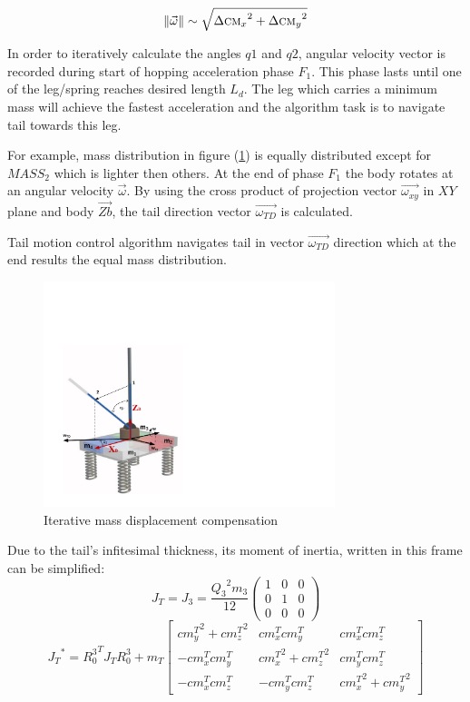\begin{equation}
\left \| \vec{\omega} \right \|\sim \sqrt{{\Delta \textsc{cm}_x}^2+{\Delta \textsc{cm}_y}^2}
\end{equation}


In order to iteratively calculate the angles $q1$ and $q2$, angular velocity vector is recorded during start of hopping acceleration phase $F_1$. This phase lasts until one of the leg/spring reaches desired length $L_d$. The leg which carries a minimum mass will achieve the fastest acceleration and the algorithm task is to navigate tail towards this leg. 

For example, mass distribution in figure  (\ref{fig:imassCom}) is equally distributed except for $MASS_2$  which is lighter then others. At the end of phase $F_1$ the body rotates at an angular velocity $\vec{\omega}$. By using the cross product of projection vector $\vec{\omega_{xy}}$ in $XY$ plane and body $\vec{Zb}$, the tail direction vector $\vec{\omega_{TD}}$ is calculated. 

Tail motion control algorithm navigates tail in vector $\vec{\omega_{TD}}$ direction which at the end results the equal mass distribution.


\begin{figure}
	\centering
	\includegraphics[width=85mm]{./pictures/IterativeAlgorithm.pdf}
	\caption{Iterative mass displacement compensation}
	\label{fig:imassCom}
\end{figure}





Due to the tail's infitesimal thickness, its moment of inertia, written in this frame can be simplified:
\begin{equation}
J_T=J_3=\frac{{Q_3}^2 m_3}{12}\left(
\begin{array}{ccc}
 1 & 0 & 0 \\
 0 & 1 & 0 \\
 0 & 0 & 0
\end{array}
\right)
\end{equation} 
\small
\begin{equation}
{J_T}^*={R_0^3}^TJ_TR_0^3+m_T\begin{bmatrix}
{cm_y^T}^2 +{cm_z^T}^2& {cm_x^T}{cm_y^T}& {cm_x^T}{cm_z^T} \\ 
-{cm_x^T}{cm_y^T} & {cm_x^T}^2+{cm_z^T}^2 & {cm_y^T}{cm_z^T}\\ 
-{cm_x^T}{cm_z^T} & -{cm_y^T}{cm_z^T} & {cm_x^T}^2+{cm_y^T}^2
\end{bmatrix}
\end{equation}
\normalsize

